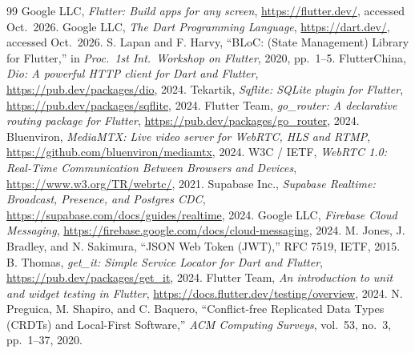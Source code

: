 \documentclass[conference,a4paper]{IEEEtran}
\begin{document}
\begin{thebibliography}{99}
 Google LLC, \emph{Flutter: Build apps for any screen}, \url{https://flutter.dev/}, accessed Oct.\ 2026.
 Google LLC, \emph{The Dart Programming Language}, \url{https://dart.dev/}, accessed Oct.\ 2026.
 S. Lapan and F. Harvy, ``BLoC: (State Management) Library for Flutter,'' in \emph{Proc.\ 1st Int.\ Workshop on Flutter}, 2020, pp.\ 1--5.
 FlutterChina, \emph{Dio: A powerful HTTP client for Dart and Flutter}, \url{https://pub.dev/packages/dio}, 2024.
 Tekartik, \emph{Sqflite: SQLite plugin for Flutter}, \url{https://pub.dev/packages/sqflite}, 2024.
 Flutter Team, \emph{go\_router: A declarative routing package for Flutter}, \url{https://pub.dev/packages/go_router}, 2024.
 Bluenviron, \emph{MediaMTX: Live video server for WebRTC, HLS and RTMP}, \url{https://github.com/bluenviron/mediamtx}, 2024.
 W3C / IETF, \emph{WebRTC 1.0: Real-Time Communication Between Browsers and Devices}, \url{https://www.w3.org/TR/webrtc/}, 2021.
 Supabase Inc., \emph{Supabase Realtime: Broadcast, Presence, and Postgres CDC}, \url{https://supabase.com/docs/guides/realtime}, 2024.
 Google LLC, \emph{Firebase Cloud Messaging}, \url{https://firebase.google.com/docs/cloud-messaging}, 2024.
 M. Jones, J. Bradley, and N. Sakimura, ``JSON Web Token (JWT),'' RFC 7519, IETF, 2015.
 B. Thomas, \emph{get\_it: Simple Service Locator for Dart and Flutter}, \url{https://pub.dev/packages/get_it}, 2024.
 Flutter Team, \emph{An introduction to unit and widget testing in Flutter}, \url{https://docs.flutter.dev/testing/overview}, 2024.
 N. Preguica, M. Shapiro, and C. Baquero, ``Conflict-free Replicated Data Types (CRDTs) and Local-First Software,'' \emph{ACM Computing Surveys}, vol.\ 53, no.\ 3, pp.\ 1--37, 2020.
\end{thebibliography}


\end{document}
